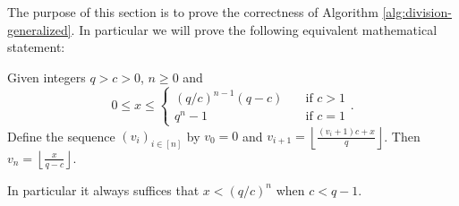 
The purpose of this section is to prove the correctness of Algorithm \ref{alg:division-generalized}.
In particular we will prove the following equivalent mathematical statement:

\begin{theorem}\label{thm:simple-div}
   Given integers $q>c>0$, $n\ge 0$ and
   $$0\le x \le \begin{cases}
      (q/c)^{n-1}(q-c) &\quad\text{if } c > 1\\
      q^{n} - 1 &\quad\text{if } c = 1
   \end{cases}.$$
   Define the sequence $(v_i)_{i\in[n]}$ by
   $
      v_0 = 0$ and
      $v_{i+1} = \left\lfloor\frac{(v_i+1)c+x}{q}\right\rfloor$.
   Then
   $
      v_n = \left\lfloor\frac{x}{q-c}\right\rfloor$.
\end{theorem}
In particular it always suffices that $x< (q/c)^n$ when $c<q-1$.

